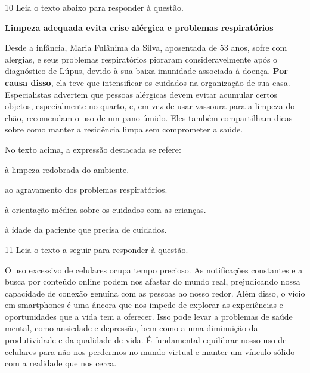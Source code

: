 \num{10} Leia o texto abaixo para responder à questão.

\begin{myquote}

\textbf{Limpeza adequada evita crise alérgica e problemas
respiratórios}

Desde a infância, Maria Fulânima da Silva, aposentada de 53 anos, sofre com alergias, e
seus problemas respiratórios pioraram consideravelmente após o diagnóstico de
Lúpus, devido à sua baixa imunidade associada à doença. \textbf{Por causa disso}, ela
teve que intensificar os cuidados na organização de sua casa. Especialistas
advertem que pessoas alérgicas devem evitar acumular certos objetos,
especialmente no quarto, e, em vez de usar vassoura para a limpeza do chão,
recomendam o uso de um pano úmido. Eles também compartilham dicas sobre como
manter a residência limpa sem comprometer a saúde.


\end{myquote}

No texto acima, a expressão destacada se refere:

\begin{escolha}
  
  \item à limpeza redobrada do ambiente.
  
  \item ao agravamento dos problemas respiratórios.
  
  \item à orientação médica sobre os cuidados com as crianças.
  
  \item à idade da paciente que precisa de cuidados.

\end{escolha}

\num{11} Leia o texto a seguir para responder à questão.

\begin{myquote}

O uso excessivo de celulares ocupa tempo precioso. As notificações constantes
e a busca por conteúdo online podem nos afastar do mundo real,
prejudicando nossa capacidade de conexão genuína com as pessoas ao nosso
redor. Além disso, o vício em smartphones é uma âncora que nos impede de
explorar as experiências e oportunidades que a vida tem a oferecer. Isso pode
levar a problemas de saúde mental, como ansiedade e depressão, bem como a uma
diminuição da produtividade e da qualidade de vida. É fundamental equilibrar
nosso uso de celulares para não nos perdermos no mundo virtual e manter um
vínculo sólido com a realidade que nos cerca.


\end{myquote}

